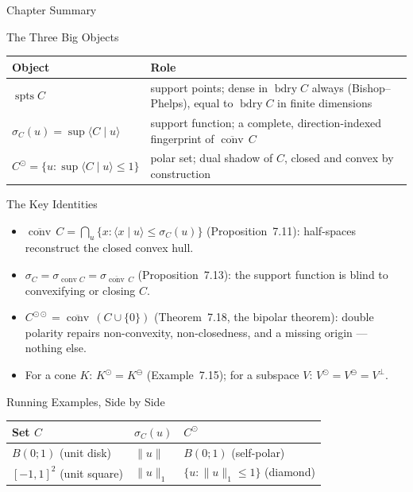 \documentclass[aspectratio=169,10pt]{beamer}
\DeclareMathOperator{\conv}{conv}
\DeclareMathOperator{\spts}{spts}
\DeclareMathOperator{\bdry}{bdry}
\newcommand{\ip}[2]{\langle #1 \mid #2 \rangle}
\newcommand{\closure}[1]{\overline{#1}}
\begin{document}
\begin{frame}[allowframebreaks]{Chapter Summary}

  \begin{block}{The Three Big Objects}
    \centering
    \begin{tabular}{lp{6.6cm}}
      \toprule
      \textbf{Object} & \textbf{Role} \\
      \midrule
      $\spts C$ & support points; dense in $\bdry C$ always
        (Bishop--Phelps), equal to $\bdry C$ in finite dimensions \\
      $\sigma_C(u) = \sup\ip{C}{u}$ & support function; a complete,
        direction-indexed fingerprint of $\closure{\conv}\,C$ \\
      $C^\odot = \{u : \sup\ip{C}{u}\le 1\}$ & polar set; dual shadow of
        $C$, closed and convex by construction \\
      \bottomrule
    \end{tabular}
  \end{block}

  \begin{block}{The Key Identities}
    \begin{itemize}
      \item $\closure{\conv}\,C = \bigcap_{u} \{x : \ip{x}{u} \le
        \sigma_C(u)\}$ (Proposition~7.11): half-spaces reconstruct the
        closed convex hull.
      \item $\sigma_C = \sigma_{\conv C} = \sigma_{\closure{\conv}\,C}$
        (Proposition~7.13): the support function is blind to convexifying
        or closing $C$.
      \item $C^{\odot\odot} = \closure{\conv}\,(C\cup\{0\})$
        (Theorem~7.18, the bipolar theorem): double polarity repairs
        non-convexity, non-closedness, and a missing origin --- nothing
        else.
      \item For a cone $K$: $K^\odot = K^\ominus$ (Example~7.15); for a
        subspace $V$: $V^\odot=V^\ominus=V^\perp$.
    \end{itemize}
  \end{block}

  \framebreak

  \begin{block}{Running Examples, Side by Side}
    \centering
    \begin{tabular}{lll}
      \toprule
      \textbf{Set $C$} & \textbf{$\sigma_C(u)$} & \textbf{$C^\odot$} \\
      \midrule
      $B(0;1)$ (unit disk) & $\|u\|$ & $B(0;1)$ (self-polar) \\
      $[-1,1]^2$ (unit square) & $\|u\|_1$ & $\{u:\|u\|_1\le 1\}$ (diamond) \\
      \bottomrule
    \end{tabular}
  \end{block}


\end{frame}
\end{document}
